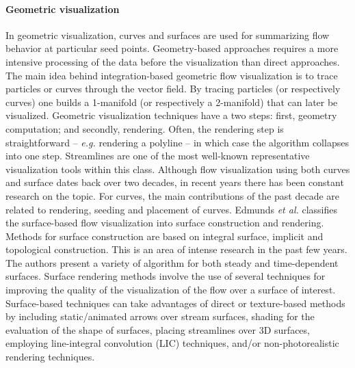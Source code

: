 \paragraph{Geometric visualization} 
%
In geometric visualization, curves and surfaces are used for summarizing flow behavior at particular seed points.
%
Geometry-based approaches requires a more intensive processing of the data before the visualization than direct approaches. 
%
The main idea behind integration-based geometric flow visualization is to trace particles or curves through the vector field. 
%
By tracing particles (or respectively curves) one builds a 1-manifold (or respectively a 2-manifold) that can later be visualized.
%
Geometric visualization techniques have a two steps: first, geometry computation; and secondly, rendering. 
%
Often, the rendering step is straightforward -- \emph{e.g.} rendering a polyline -- in which case the algorithm collapses into one step.
%
Streamlines are one of the most well-known representative visualization tools within this class. 
%
Although flow visualization using both curves and surface dates back over two decades, in recent years there has been constant research on the topic\cite{Edmunds2012974}. 
%
%
For curves, the main contributions of the past decade are related to rendering, seeding and placement of curves.
%
Edmunds \emph{et al.}\cite{Edmunds2012974} classifies the surface-based flow visualization into surface construction and rendering. 
%
Methods for surface construction are based on integral surface, implicit and topological construction. 
%
This is an area of intense research in the past few years.
%
The authors present a variety of algorithm for both steady and time-dependent surfaces. 
%
Surface rendering methods involve the use of several techniques for improving the quality of the visualization of the flow over a surface of interest. 
%
Surface-based techniques can take advantages of direct or texture-based methods by including static/animated arrows over stream surfaces, shading for the evaluation of the shape of surfaces, placing streamlines over 3D surfaces, employing line-integral convolution (LIC) techniques, and/or non-photorealistic rendering techniques.


